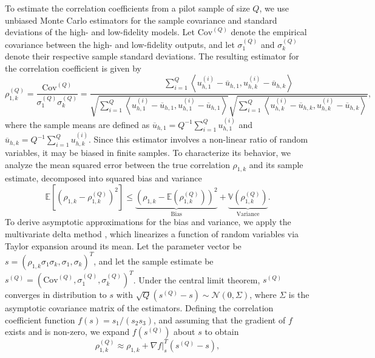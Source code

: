 To estimate the correlation coefficients from a pilot sample of size $Q$, we use unbiased Monte Carlo estimators for the sample covariance and standard deviations of the high- and low-fidelity models. Let $\text{Cov}^{(Q)}$ denote the empirical covariance between the high- and low-fidelity outputs, and let $\sigma_1^{(Q)}$ and $\sigma_k^{(Q)}$ denote their respective sample standard deviations. The resulting estimator for the correlation coefficient is given by
%
\[
\rho_{1,k}^{(Q)} = \frac{\text{Cov}^{(Q)}}{\sigma_1^{(Q)}\sigma_k^{(Q)}} = \frac{\sum_{i=1}^Q\left\langle u_{h,1}^{(i)} - \overline{u}_{h,1},  u_{h,k}^{(i)} - \overline{u}_{h,k} \right\rangle}{\sqrt{\sum_{i=1}^Q \left\langle u_{h,1}^{(i)} - \overline{u}_{h,1}, u_{h,1}^{(i)} - \overline{u}_{h,1} \right\rangle} \sqrt{\sum_{i=1}^Q \left\langle u_{h,k}^{(i)} - \overline{ u}_{h,k}, u_{h,k}^{(i)} - \overline{u}_{h,k} \right\rangle}},
\]
%
where the sample means are defined as $\overline{u}_{h,1} = Q^{-1}\sum_{i=1}^Q u_{h,1}^{(i)}$ and $\overline{  u}_{h,k} = Q^{-1}\sum_{i=1}^Q u_{h,k}^{(i)}$. Since this estimator involves a non-linear ratio of random variables, it may be biased in finite samples. To characterize its behavior, we analyze the mean squared error between the true correlation $\rho_{1,k}$ and its sample estimate, decomposed into squared bias and variance
%
\begin{equation}
\label{eq:MSE_rho}
    \mathbb{E}\left[\left(\rho_{1,k} - \rho_{1,k}^{(Q)}\right)^2\right]\le \underbrace{\left(\rho_{1,k} - \mathbb{E}\left(\rho_{1,k}^{(Q)}\right)\right)^2}_{\text{Bias}}+\underbrace{\mathbb{V}\left(\rho_{1,k}^{(Q)}\right)}_{\text{Variance}}.
\end{equation}
%
To derive asymptotic approximations for the bias and variance, we apply the multivariate delta method \cite{Cr:1946,Oe:1992}, which linearizes a function of random variables via Taylor expansion around its mean. Let the parameter vector be $s = (\rho_{1,k}\sigma_1\sigma_k, \sigma_1, \sigma_k)^T$, and let the sample estimate be $s^{(Q)} = (\text{Cov}^{(Q)}, \sigma_1^{(Q)}, \sigma_k^{(Q)})^T$. Under the central limit theorem, $s^{(Q)}$ converges in distribution to $s$ with $\sqrt{Q}(s^{(Q)}-s)\sim \mathcal{N}(0,\Sigma)$, where $\Sigma$ is the asymptotic covariance matrix of the estimators. Defining the correlation coefficient function $f(s) = s_1 / (s_2 s_3)$, and assuming that the gradient of $f$ exists and is non-zero, we expand $f(s^{(Q)})$ about $s$ to obtain
%
\begin{equation}
\label{eq:Correlated_Coeff_approx}
  \rho_{1,k}^{(Q)} \approx \rho_{1,k} + \nabla f |_{s}^T \left(s^{(Q)}-s\right), 
\end{equation}
